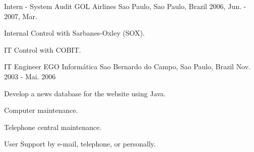 \begin{cventries}
  \cventry
    {Intern - System Audit} %
    {GOL Airlines} %
    {Sao Paulo, Sao Paulo, Brazil} %
    {2006, Jun. - 2007, Mar.} %
    {
          \begin{cvitems} %
            \item {Internal Control with Sarbanes-Oxley (SOX).}
            \item {IT Control with COBIT.}
          \end{cvitems}
    }

  \cventry
    {IT Engineer} %
    {EGO Informática} %
    {Sao Bernardo do Campo, Sao Paulo, Brazil} %
    {Nov. 2003 - Mai. 2006} %
    {
          \begin{cvitems} %
            \item {Develop a news database for the website using Java.}
            \item {Computer maintenance.}
            \item {Telephone central maintenance.}
            \item {User Support by e-mail, telephone, or personally.}
          \end{cvitems}
    }

\end{cventries}
